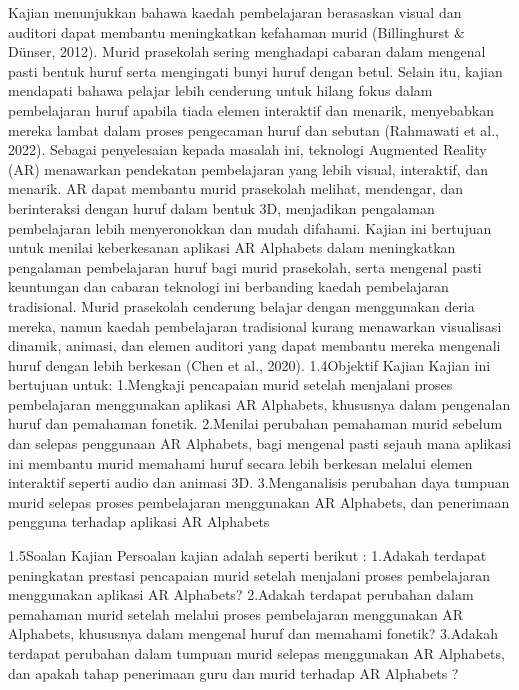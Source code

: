 Kajian menunjukkan bahawa kaedah pembelajaran berasaskan visual dan auditori dapat membantu meningkatkan kefahaman murid (Billinghurst & Dünser, 2012). Murid prasekolah sering menghadapi cabaran dalam mengenal pasti bentuk huruf serta mengingati bunyi huruf dengan betul. Selain itu, kajian mendapati bahawa pelajar lebih cenderung untuk hilang fokus dalam pembelajaran huruf apabila tiada elemen interaktif dan menarik, menyebabkan mereka lambat dalam proses pengecaman huruf dan sebutan (Rahmawati et al., 2022).
Sebagai penyelesaian kepada masalah ini, teknologi Augmented Reality (AR) menawarkan pendekatan pembelajaran yang lebih visual, interaktif, dan menarik. AR dapat membantu murid prasekolah melihat, mendengar, dan berinteraksi dengan huruf dalam bentuk 3D, menjadikan pengalaman pembelajaran lebih menyeronokkan dan mudah difahami.
Kajian ini bertujuan untuk menilai keberkesanan aplikasi AR Alphabets dalam meningkatkan pengalaman pembelajaran huruf bagi murid prasekolah, serta mengenal pasti keuntungan dan cabaran teknologi ini berbanding kaedah pembelajaran tradisional. Murid prasekolah cenderung belajar dengan menggunakan deria mereka, namun kaedah pembelajaran tradisional kurang menawarkan visualisasi dinamik, animasi, dan elemen auditori yang dapat membantu mereka mengenali huruf dengan lebih berkesan (Chen et al., 2020).
1.4Objektif Kajian
Kajian ini bertujuan untuk:
1.Mengkaji pencapaian murid setelah menjalani proses pembelajaran menggunakan aplikasi AR Alphabets, khususnya dalam pengenalan huruf dan pemahaman fonetik. 
2.Menilai perubahan pemahaman murid sebelum dan selepas penggunaan AR Alphabets, bagi mengenal pasti sejauh mana aplikasi ini membantu murid memahami huruf secara lebih berkesan melalui elemen interaktif seperti audio dan animasi 3D.
3.Menganalisis perubahan daya tumpuan murid selepas proses pembelajaran menggunakan AR Alphabets, dan penerimaan pengguna terhadap aplikasi AR Alphabets

1.5Soalan Kajian
Persoalan kajian adalah seperti berikut :
1.Adakah terdapat peningkatan prestasi pencapaian murid setelah menjalani proses pembelajaran menggunakan aplikasi AR Alphabets?
2.Adakah terdapat perubahan dalam pemahaman murid setelah melalui proses pembelajaran menggunakan AR Alphabets, khususnya dalam mengenal huruf dan memahami fonetik?
3.Adakah terdapat perubahan dalam tumpuan murid selepas menggunakan AR Alphabets, dan apakah tahap penerimaan guru dan murid terhadap AR Alphabets ?

